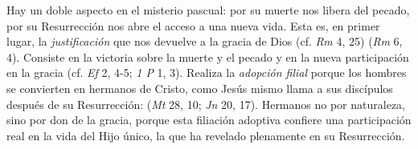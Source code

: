  Hay un doble aspecto en el misterio pascual: por su muerte nos libera del pecado, por su Resurrección nos abre el acceso a una nueva vida. Esta es, en primer lugar, la \emph{justificación} que nos devuelve a la gracia de Dios (cf. \emph{Rm} 4, 25)  (\emph{Rm} 6, 4). Consiste en la victoria sobre la muerte y el pecado y en la nueva participación en la gracia (cf. \emph{Ef} 2, 4-5; \emph{1 P} 1, 3). Realiza la \emph{adopción filial} porque los hombres se convierten en hermanos de Cristo, como Jesús mismo llama a sus discípulos después de su Resurrección:  (\emph{Mt} 28, 10; \emph{Jn} 20, 17). Hermanos no por naturaleza, sino por don de la gracia, porque esta filiación adoptiva confiere una participación real en la vida del Hijo único, la que ha revelado plenamente en su Resurrección.